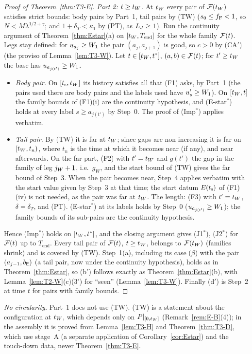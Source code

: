 \begin{proof}[Proof of Theorem~\ref{thm:T3-E}]
\emph{Part 2: $t\ge t_W$.} At $t_W$ every pair of $\mathcal F(t_W)$ satisfies strict bounds: body pairs by Part~1, tail pairs by (TW)
($s_0\le f_{\mathrm F}<1$, so $N<M\lambda^{1/2+\gamma}$; and $1+\delta_T<\kappa_1$ by (PT), as $L_J\ge1$). Run the continuity argument of
Theorem~\ref{thm:Estar}(a) on $[t_W,T_{\mathrm{end}}]$ for the whole family $\mathcal F(t)$. Legs stay defined: for $u_{a_j}\ge W_1$
the pair $(a_j,a_{j+1})$ is good, so $c>0$ by (CA$'$) (the proviso of Lemma~\ref{lem:T3-W}). Let $t\in[t_W,t^*]$, $(a,b)\in\mathcal F(t)$;
for $t'\ge t_W$ the base has $u_{a_{j(t')}}\ge W_1$.
\begin{itemize}
\item \emph{Body pair.} On $[t_{\mathrm s},t_W]$ its history satisfies all that (F1) asks, by Part~1 (the pairs used there are body pairs
and the labels used have $u_s'\ge W_1$). On $[t_W,t]$ the family bounds of (F1)(i) are the continuity hypothesis, and
(E-star$^*$) holds at every label $s\ge a_{j(t')}$ by Step~0. The proof of (Imp$^*$) applies verbatim.
\item \emph{Tail pair.} By (TW) it is far at $t_W$; since gaps are non-increasing it is far on $[t_W,t_n)$, where $t_n$ is
the time at which it becomes near (if any), and near afterwards. On the far part, (F2) with $t'=t_W$ and $g(t')$ the gap in the family of leg $j_W+1$, i.e.\ $g_W$, and the start bound of (TW)
gives the far bound of Step~3. When the pair becomes near, Step~4 applies verbatim with the start value given by Step~3 at that
time; the start datum $E(t_{\mathrm s})$ of (F1)(iv) is not needed, as the pair was far at $t_W$. The length: (F3) with $t'=t_W$,
$\delta=\delta_T$, and (PT). (E-star$^*$) at its labels holds by Step~0 ($u_{a_{j(t')}}\ge W_1$); the family bounds of its
sub-pairs are the continuity hypothesis.
\end{itemize}
Hence (Imp$^*$) holds on $[t_W,t^*]$, and the closing argument gives (J1$^*$), (J2$^*$) for $\mathcal F(t)$ up to $T_{\mathrm{end}}$. Every
tail pair of $\mathcal F(t)$, $t\ge t_W$, belongs to $\mathcal F(t_W)$ (families shrink) and is covered by (TW). Step~1(a), including its case
($\beta$) with the pair $(a_{j-1},b_{\mathsf E})$ (a tail pair, now under the continuity hypothesis), holds as in
Theorem~\ref{thm:Estar}, so (b$'$) follows exactly as Theorem~\ref{thm:Estar}(b), with Lemma~\ref{lem:T2-W}(c)\textup{($3'$)} for
``seen'' (Lemma~\ref{lem:T3-W}). Finally (d$'$) is Step~2 at time $t$ for pairs with family bounds.
\end{proof}

\noindent\emph{No circularity.} Part~1 does not use (TW). (TW) is a statement about the configuration at $t_W$, which depends
only on $P|_{[0,t_W]}$ (Remark~\ref{rem:E-B}(4)); in the assembly it is proved from Lemma~\ref{lem:T3-H} and
Theorem~\ref{thm:T3-D}, which use stage~A (a separate application of Corollary~\ref{cor:Estar}) and the touch-down data, never
Theorem~\ref{thm:T3-E}.

